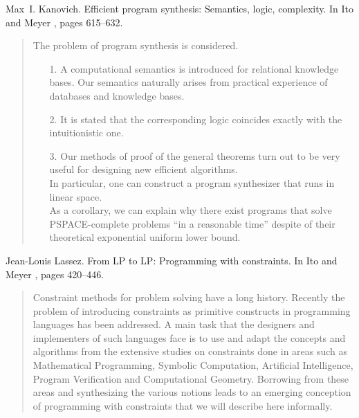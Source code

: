 \begin{thebibliography}{10}
Max~I. Kanovich.
\newblock Efficient program synthesis: Semantics, logic, complexity.
\newblock In Ito and Meyer \cite{TACS91}, pages 615--632.
\begin{quotation}
The problem of program synthesis is considered. \begin{itemize} \item[1.] A
  computational semantics is introduced for relational knowledge bases. Our
  semantics naturally arises from practical experience of databases and
  knowledge bases. \item[2.] It is stated that the corresponding logic
  coincides exactly with the intui\-tionistic one. \item[3.] Our methods of
  proof of the general theorems turn out to be very useful for designing new
  efficient algorithms.\\ In particular, one can construct a program
  synthesizer that runs in linear space.\\ As a corollary, we can explain why
  there exist programs that solve PSPACE-complete problems ``in a reasonable
  time'' despite of their theoretical exponential uniform lower bound.
  \end{itemize}
\end{quotation}

Jean-Louis Lassez.
\newblock From {LP} to {LP}: Programming with constraints.
\newblock In Ito and Meyer \cite{TACS91}, pages 420--446.
\begin{quotation}
Constraint methods for problem solving have a long history. Recently the
  problem of introducing constraints as primitive constructs in programming
  languages has been addressed. A main task that the designers and implementers
  of such languages face is to use and adapt the concepts and algorithms from
  the extensive studies on constraints done in areas such as Mathematical
  Programming, Symbolic Computation, Artificial Intelligence, Program
  Verification and Computational Geometry. Borrowing from these areas and
  synthesizing the various notions leads to an emerging conception of
  programming with constraints that we will describe here informally.
\end{quotation}


\end{thebibliography}
